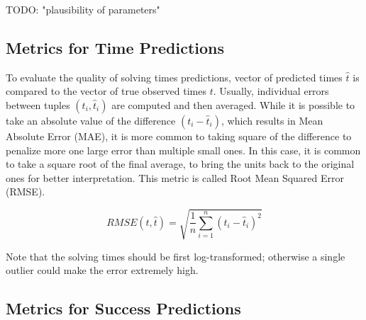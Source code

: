 TODO: "plausibility of parameters" \cite{learner-models-integration-skills}


\subsection{Metrics for Time Predictions}
\label{sec:metrics-for-time-predictions}

To evaluate the quality of solving times predictions,
  vector of predicted times $\hat{t}$ is compared to
  the vector of true observed times $t$.
Usually, individual errors between tuples $(t_i, \hat{t}_i)$ are computed
  and then averaged.
While it is possible to take an absolute value of the
  difference $(t_i - \hat{t}_i)$,
  which results in Mean Absolute Error (MAE),
it is more common to taking square of the difference
  to penalize more one large error than multiple small ones.
In this case, it is common to take a square root of the final
  average, to bring the units back to the original ones
  for better interpretation.
This metric is called Root Mean Squared Error (RMSE).

$$
RMSE(t, \hat{t}) = \sqrt{\frac{1}{n} \sum_{i=1}^n (t_i - \hat{t}_i)^2}
$$

Note that the solving times should be first log-transformed;
  otherwise a single outlier could make the error extremely high.




\subsection{Metrics for Success Predictions}
\label{sec:metrics-for-success-predictions}

